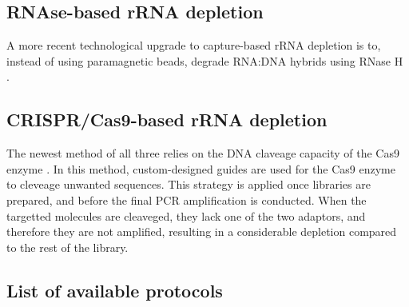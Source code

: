 \documentclass[
]{book}
\begin{document}
\hypertarget{rnase-based-rrna-depletion}{%
\subsection*{RNAse-based rRNA depletion}\label{rnase-based-rrna-depletion}}

A more recent technological upgrade to capture-based rRNA depletion is to, instead of using paramagnetic beads, degrade RNA:DNA hybrids using RNase H \citep{Huang2020-xf}.

\hypertarget{cas9-based-rrna-depletion}{%
\subsection*{CRISPR/Cas9-based rRNA depletion}\label{cas9-based-rrna-depletion}}

The newest method of all three relies on the DNA claveage capacity of the Cas9 enzyme \citep{Gu2016-yf}. In this method, custom-designed guides are used for the Cas9 enzyme to cleveage unwanted sequences. This strategy is applied once libraries are prepared, and before the final PCR amplification is conducted. When the targetted molecules are cleaveged, they lack one of the two adaptors, and therefore they are not amplified, resulting in a considerable depletion compared to the rest of the library.

\hypertarget{rrna-depletion-protocols}{%
\subsection*{List of available protocols}\label{rrna-depletion-protocols}}
\end{document}
